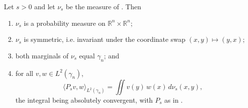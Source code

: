 \begin{lemma}
Let $s > 0$ and let $\nu_s$ be the measure of .  Then
\begin{enumerate}
\item $\nu_s$ is a probability measure on $\mathbb{R}^n \times \mathbb{R}^n$;
\item $\nu_s$ is symmetric, i.e. invariant under the coordinate swap
$(x,y)\mapsto(y,x)$;
\item both marginals of $\nu_s$ equal $\gamma_n$; and
\item for all $v, w \in L^2(\gamma_n)$,
\[
  \langle P_s v, w\rangle_{L^2(\gamma_n)}
    = \iint v(y)\, w(x)\, d\nu_s(x,y),
\]
the integral being absolutely convergent, with $P_s$ as in .
\end{enumerate}
\end{lemma}
